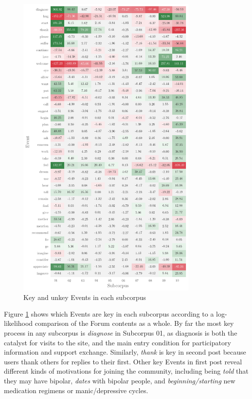\documentclass{article}
\begin{document}
\begin{figure}
    \includegraphics[width=0.80\textwidth]{images/event-heatmap.png}
    \hspace{1.6cm}
    \caption{Key and unkey Events in each subcorpus}
    \label{fig:event_heatmap}
 \end{figure}

Figure \ref{fig:event_heatmap} shows which Events are key in each subcorpus according to a log-likelihood comparison of the Forum contents as a whole. By far the most key process in any subcorpus is \emph{diagnose} in Subcorpus 01, as diagnosis is both the catalyst for visits to the site, and the main entry condition for participatory information and support exchange. Similarly, \emph{thank} is key in second post because users thank others for replies to their first. Other key Events in first post reveal different kinds of motivations for joining the community, including being \emph{told} that they may have bipolar, \emph{dates} with bipolar people, and \emph{beginning\slash starting} new medication regimens or manic\slash depressive cycles.
\end{document}
